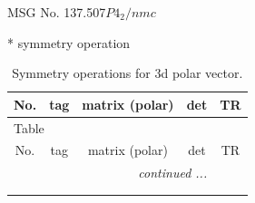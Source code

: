 \documentclass[fleqn,8pt]{jsarticle}
\begin{document}
\setcounter{MaxMatrixCols}{32}

\renewcommand{\tablename}{Table~}
\renewcommand{\figurename}{Figure~}
\begin{center}
\LARGE
MSG No. 137.507\quad$P4_{2}/nmc$
\end{center}
* symmetry operation
\renewcommand{\arraystretch}{1.3}
\begin{longtable}{ccccc}
\caption{Symmetry operations for 3d polar vector.}
 \\
 \hline \hline
No. & tag & matrix (polar) & det & TR \\ \hline \endfirsthead

\multicolumn{4}{l}{\tablename\ \thetable{}} \\
 \hline \hline
No. & tag & matrix (polar) & det & TR \\ \hline \endhead

 \hline \hline
\multicolumn{4}{r}{\footnotesize\it continued ...} \\ \endfoot

 \hline \hline
\multicolumn{4}{r}{} \\ \endlastfoot


\end{longtable}
\end{document}
